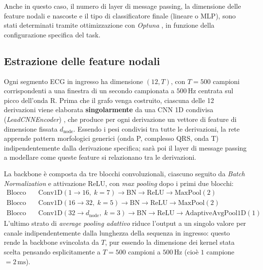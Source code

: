 Anche in questo caso, il numero di layer di message passing, la dimensione delle feature nodali e nascoste e il tipo di classificatore finale (lineare o MLP), sono stati determinati tramite ottimizzazione con \emph{Optuna} \cite{akiba2019optuna}, in funzione della configurazione specifica del task.

\subsection{Estrazione delle feature nodali}
\label{sec:lead_cnn_encoder}

Ogni segmento ECG in ingresso ha dimensione $(12, T)$, con $T=500$ campioni corrispondenti a una finestra di un secondo campionata a $500\,\text{Hz}$ centrata sul picco dell'onda R. Prima che il grafo venga costruito, ciascuna delle 12 derivazioni viene elaborata \textbf{singolarmente} da una CNN 1D condivisa (\textit{LeadCNNEncoder}) \cite{lecun1998gradient}, che produce per ogni derivazione un vettore di feature di dimensione fissata $d_{\text{node}}$. Essendo i pesi condivisi tra tutte le derivazioni, la rete apprende pattern morfologici generici (onda P, complesso QRS, onda T) indipendentemente dalla derivazione specifica; sarà poi il layer di message passing a modellare come queste feature si relazionano tra le derivazioni.

La backbone è composta da tre blocchi convoluzionali, ciascuno seguito da \textit{Batch Normalization} \cite{ioffe2015batchnorm} e attivazione ReLU, con \textit{max pooling} dopo i primi due blocchi:
\[
\begin{aligned}
	\text{Blocco 1:}\quad &\text{Conv1D}(1 \to 16,\; k=7) \to \text{BN} \to \text{ReLU} \to \text{MaxPool}(2) \\
	\text{Blocco 2:}\quad &\text{Conv1D}(16 \to 32,\; k=5) \to \text{BN} \to \text{ReLU} \to \text{MaxPool}(2) \\
	\text{Blocco 3:}\quad &\text{Conv1D}(32 \to d_{\text{node}},\; k=3) \to \text{BN} \to \text{ReLU} \to \text{AdaptiveAvgPool1D}(1)
\end{aligned}
\]
L'ultimo strato di \textit{average pooling adattivo} riduce l'output a un singolo valore per canale indipendentemente dalla lunghezza della sequenza in ingresso: questo rende la backbone svincolata da $T$, pur essendo la dimensione dei kernel stata scelta pensando esplicitamente a $T=500$ campioni a $500\,\text{Hz}$ (cioè $1$ campione $=2\,\text{ms}$).

